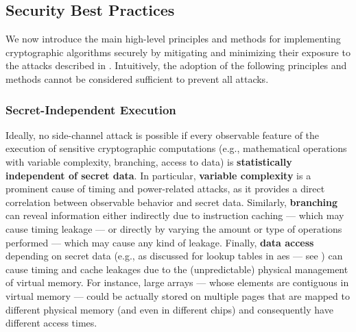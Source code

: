 \subsection{Security Best Practices}\label{sec:security_of_cryptographic_algorithms:best_practices}

We now introduce the main high-level principles and methods for implementing cryptographic algorithms securely by mitigating and minimizing their exposure to the attacks described in . Intuitively, the adoption of the following principles and methods cannot be considered sufficient to prevent all attacks.


\subsubsection{Secret-Independent Execution}\label{sec:security_of_cryptographic_algorithms:best_practices:independent}

Ideally, no side-channel attack is possible if every observable feature of the execution of sensitive cryptographic computations (e.g., mathematical operations with variable complexity, branching, access to data) is \textbf{statistically independent of secret data}. In particular, \textbf{variable complexity} is a prominent cause of timing and power-related attacks, as it provides a direct correlation between observable behavior and secret data. Similarly, \textbf{branching} can reveal information either indirectly due to instruction caching --- which may cause timing leakage --- or directly by varying the amount or type of operations performed --- which may cause any kind of leakage. Finally, \textbf{data access} depending on secret data (e.g., as discussed for lookup tables in \gls{aes} --- see ) can cause timing and cache leakages due to the (unpredictable) physical management of virtual memory. For instance, large arrays --- whose elements are contiguous in virtual memory --- could be actually stored on multiple pages that are mapped to different physical memory (and even in different chips) and consequently have different access times.

